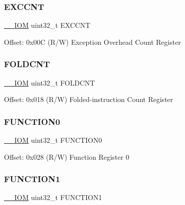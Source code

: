\subsubsection{\texorpdfstring{E\+X\+C\+C\+NT}{EXCCNT}}
{\footnotesize\ttfamily \mbox{\hyperlink{core__cm4_8h_ab6caba5853a60a17e8e04499b52bf691}{\+\_\+\+\_\+\+I\+OM}} uint32\+\_\+t E\+X\+C\+C\+NT}

Offset\+: 0x00C (R/W) Exception Overhead Count Register \mbox{\label{struct_d_w_t___type_a6324c1fbf6c94f1eaf742d09ad678216}} 
\subsubsection{\texorpdfstring{F\+O\+L\+D\+C\+NT}{FOLDCNT}}
{\footnotesize\ttfamily \mbox{\hyperlink{core__cm4_8h_ab6caba5853a60a17e8e04499b52bf691}{\+\_\+\+\_\+\+I\+OM}} uint32\+\_\+t F\+O\+L\+D\+C\+NT}

Offset\+: 0x018 (R/W) Folded-\/instruction Count Register \mbox{\label{struct_d_w_t___type_ad3c69d206a52a85165eb7bd8077b0608}} 
\subsubsection{\texorpdfstring{F\+U\+N\+C\+T\+I\+O\+N0}{FUNCTION0}}
{\footnotesize\ttfamily \mbox{\hyperlink{core__cm4_8h_ab6caba5853a60a17e8e04499b52bf691}{\+\_\+\+\_\+\+I\+OM}} uint32\+\_\+t F\+U\+N\+C\+T\+I\+O\+N0}

Offset\+: 0x028 (R/W) Function Register 0 \mbox{\label{struct_d_w_t___type_ae8f02e32e101c4cc61115d271fa12ffb}} 
\subsubsection{\texorpdfstring{F\+U\+N\+C\+T\+I\+O\+N1}{FUNCTION1}}
{\footnotesize\ttfamily \mbox{\hyperlink{core__cm4_8h_ab6caba5853a60a17e8e04499b52bf691}{\+\_\+\+\_\+\+I\+OM}} uint32\+\_\+t F\+U\+N\+C\+T\+I\+O\+N1}


